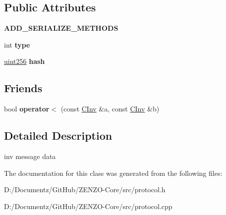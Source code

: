 \subsection*{Public Attributes}
\begin{DoxyCompactItemize}
\item 
\mbox{\label{class_c_inv_a3dc91b40ff6fe8c2c8879c81de67e209}} 
{\bfseries A\+D\+D\+\_\+\+S\+E\+R\+I\+A\+L\+I\+Z\+E\+\_\+\+M\+E\+T\+H\+O\+DS}
\item 
\mbox{\label{class_c_inv_a2da8a26c6b8824011e3144459d278c75}} 
int {\bfseries type}
\item 
\mbox{\label{class_c_inv_abfa04c38e9c0def9a2b09a9c43929744}} 
\mbox{\hyperlink{classuint256}{uint256}} {\bfseries hash}
\end{DoxyCompactItemize}
\subsection*{Friends}
\begin{DoxyCompactItemize}
\item 
\mbox{\label{class_c_inv_a2684809000d3a0523769ad7585ace197}} 
bool {\bfseries operator$<$} (const \mbox{\hyperlink{class_c_inv}{C\+Inv}} \&a, const \mbox{\hyperlink{class_c_inv}{C\+Inv}} \&b)
\end{DoxyCompactItemize}


\subsection{Detailed Description}
inv message data 

The documentation for this class was generated from the following files\+:\begin{DoxyCompactItemize}
\item 
D\+:/\+Documentz/\+Git\+Hub/\+Z\+E\+N\+Z\+O-\/\+Core/src/protocol.\+h\item 
D\+:/\+Documentz/\+Git\+Hub/\+Z\+E\+N\+Z\+O-\/\+Core/src/protocol.\+cpp\end{DoxyCompactItemize}

